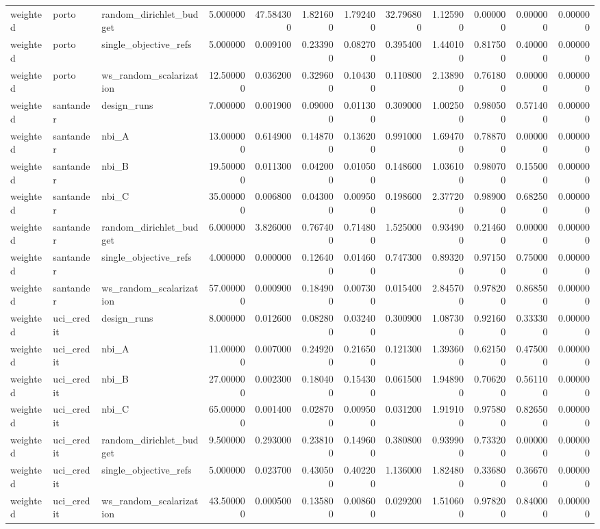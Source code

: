\begin{landscape}
\begin{longtable}{lllrrrrrrrrr}
weighted & porto & random\_dirichlet\_budget & 5.000000 & 47.584300 & 1.821600 & 1.792400 & 32.796800 & 1.125900 & 0.000000 & 0.000000 & 0.000000 \\
weighted & porto & single\_objective\_refs & 5.000000 & 0.009100 & 0.233900 & 0.082700 & 0.395400 & 1.440100 & 0.817500 & 0.400000 & 0.000000 \\
weighted & porto & ws\_random\_scalarization & 12.500000 & 0.036200 & 0.329600 & 0.104300 & 0.110800 & 2.138900 & 0.761800 & 0.000000 & 0.000000 \\
weighted & santander & design\_runs & 7.000000 & 0.001900 & 0.090000 & 0.011300 & 0.309000 & 1.002500 & 0.980500 & 0.571400 & 0.000000 \\
weighted & santander & nbi\_A & 13.000000 & 0.614900 & 0.148700 & 0.136200 & 0.991000 & 1.694700 & 0.788700 & 0.000000 & 0.000000 \\
weighted & santander & nbi\_B & 19.500000 & 0.011300 & 0.042000 & 0.010500 & 0.148600 & 1.036100 & 0.980700 & 0.155000 & 0.000000 \\
weighted & santander & nbi\_C & 35.000000 & 0.006800 & 0.043000 & 0.009500 & 0.198600 & 2.377200 & 0.989000 & 0.682500 & 0.000000 \\
weighted & santander & random\_dirichlet\_budget & 6.000000 & 3.826000 & 0.767400 & 0.714800 & 1.525000 & 0.934900 & 0.214600 & 0.000000 & 0.000000 \\
weighted & santander & single\_objective\_refs & 4.000000 & 0.000000 & 0.126400 & 0.014600 & 0.747300 & 0.893200 & 0.971500 & 0.750000 & 0.000000 \\
weighted & santander & ws\_random\_scalarization & 57.000000 & 0.000900 & 0.184900 & 0.007300 & 0.015400 & 2.845700 & 0.978200 & 0.868500 & 0.000000 \\
weighted & uci\_credit & design\_runs & 8.000000 & 0.012600 & 0.082800 & 0.032400 & 0.300900 & 1.087300 & 0.921600 & 0.333300 & 0.000000 \\
weighted & uci\_credit & nbi\_A & 11.000000 & 0.007000 & 0.249200 & 0.216500 & 0.121300 & 1.393600 & 0.621500 & 0.475000 & 0.000000 \\
weighted & uci\_credit & nbi\_B & 27.000000 & 0.002300 & 0.180400 & 0.154300 & 0.061500 & 1.948900 & 0.706200 & 0.561100 & 0.000000 \\
weighted & uci\_credit & nbi\_C & 65.000000 & 0.001400 & 0.028700 & 0.009500 & 0.031200 & 1.919100 & 0.975800 & 0.826500 & 0.000000 \\
weighted & uci\_credit & random\_dirichlet\_budget & 9.500000 & 0.293000 & 0.238100 & 0.149600 & 0.380800 & 0.939900 & 0.733200 & 0.000000 & 0.000000 \\
weighted & uci\_credit & single\_objective\_refs & 5.000000 & 0.023700 & 0.430500 & 0.402200 & 1.136000 & 1.824800 & 0.336800 & 0.366700 & 0.000000 \\
weighted & uci\_credit & ws\_random\_scalarization & 43.500000 & 0.000500 & 0.135800 & 0.008600 & 0.029200 & 1.510600 & 0.978200 & 0.840000 & 0.000000 \\
\end{longtable}\endgroup\addtocounter{table}{-1}

\end{landscape}
